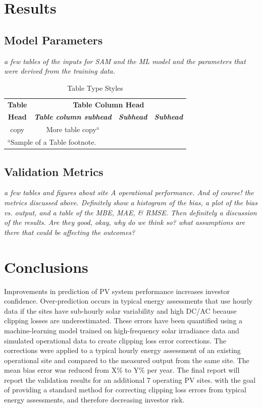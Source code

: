 \documentclass[conference]{IEEEtran}
\begin{document}
\section{Results}

\subsection{Model Parameters}

\textit{\color{red}a few tables of the inputs for SAM and the ML model and the parameters that were derived from the training data.}

\begin{table}[htbp]
\caption{Table Type Styles}
\begin{center}
\begin{tabular}{|c|c|c|c|}
\hline
\textbf{Table}&\multicolumn{3}{|c|}{\textbf{Table Column Head}} \\
\cline{2-4} 
\textbf{Head} & \textbf{\textit{Table column subhead}}& \textbf{\textit{Subhead}}& \textbf{\textit{Subhead}} \\
\hline
copy& More table copy$^{\mathrm{a}}$& &  \\
\hline
\multicolumn{4}{l}{$^{\mathrm{a}}$Sample of a Table footnote.}
\end{tabular}
\label{tab1}
\end{center}
\end{table}

\subsection{Validation Metrics}

\textit{\color{red}a few tables and figures about site A operational performance. And of course! the metrics discussed above. Definitely show a histogram of the bias, a plot of the bias vs. output, and a table of the MBE, MAE, \& RMSE. Then definitely a discussion of the results. Are they good, okay, why do we think so? what assumptions are there that could be affecting the outcomes?}

\section{Conclusions}
Improvements in prediction of PV system performance increases investor confidence. Over-prediction occurs in typical energy assessments that use hourly data if the sites have sub-hourly solar variability and high DC/AC because clipping losses are underestimated. These errors have been quantified using a machine-learning model trained on high-frequency solar irradiance data and simulated operational data to create clipping loss error corrections. The corrections were applied to a typical hourly energy assessment of an existing operational site and compared to the measured output from the same site. The mean bias error was reduced from X\% to Y\% per year. The final report will report the validation results for an additional 7 operating PV sites. with the goal of providing a standard method for correcting clipping loss errors from typical energy assessments, and therefore decreasing investor risk.
\end{document}
